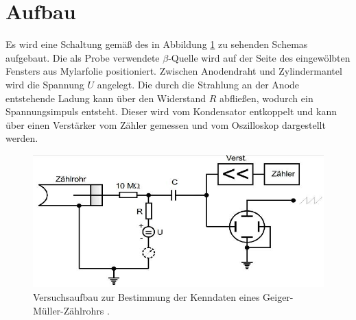 \section{Aufbau}
\label{sec:Aufbau}
Es wird eine Schaltung gemäß des in Abbildung \ref{fig:Aufbau} zu sehenden Schemas aufgebaut. Die als Probe verwendete $\beta$-Quelle wird auf der Seite des eingewölbten Fensters aus Mylarfolie positioniert. Zwischen Anodendraht und Zylindermantel wird die Spannung $U$ angelegt. Die durch die Strahlung an der Anode entstehende Ladung kann über den Widerstand $R$ abfließen, wodurch ein Spannungsimpuls entsteht. Dieser wird vom Kondensator entkoppelt und kann über einen Verstärker vom Zähler gemessen und vom Oszilloskop dargestellt werden.
\begin{figure}
\centering
\includegraphics[scale=0.5]{content/images/aufbau2.jpg}
\caption{Versuchsaufbau zur Bestimmung der Kenndaten eines Geiger-Müller-Zählrohrs \cite{V703}.}
\label{fig:Aufbau}
\end{figure}